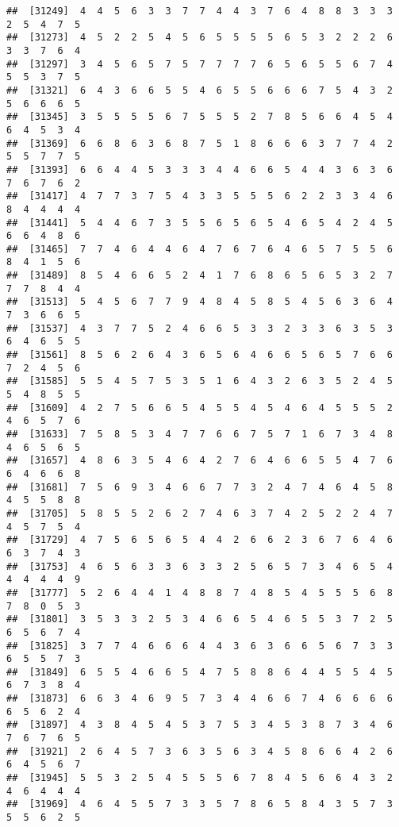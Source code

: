 \documentclass[
]{book}
\begin{document}
\begin{verbatim}
##  [31249]  4  4  5  6  3  3  7  7  4  4  3  7  6  4  8  8  3  3  3  2  5  4  7  5
##  [31273]  4  5  2  2  5  4  5  6  5  5  5  5  6  5  3  2  2  2  6  3  3  7  6  4
##  [31297]  3  4  5  6  5  7  5  7  7  7  7  6  5  6  5  5  6  7  4  5  5  3  7  5
##  [31321]  6  4  3  6  6  5  5  4  6  5  5  6  6  6  7  5  4  3  2  5  6  6  6  5
##  [31345]  3  5  5  5  5  6  7  5  5  5  2  7  8  5  6  6  4  5  4  6  4  5  3  4
##  [31369]  6  6  8  6  3  6  8  7  5  1  8  6  6  6  3  7  7  4  2  5  5  7  7  5
##  [31393]  6  6  4  4  5  3  3  3  4  4  6  6  5  4  4  3  6  3  6  7  6  7  6  2
##  [31417]  4  7  7  3  7  5  4  3  3  5  5  5  6  2  2  3  3  4  6  8  4  4  4  4
##  [31441]  5  4  4  6  7  3  5  5  6  5  6  5  4  6  5  4  2  4  5  6  6  4  8  6
##  [31465]  7  7  4  6  4  4  6  4  7  6  7  6  4  6  5  7  5  5  6  8  4  1  5  6
##  [31489]  8  5  4  6  6  5  2  4  1  7  6  8  6  5  6  5  3  2  7  7  7  8  4  4
##  [31513]  5  4  5  6  7  7  9  4  8  4  5  8  5  4  5  6  3  6  4  7  3  6  6  5
##  [31537]  4  3  7  7  5  2  4  6  6  5  3  3  2  3  3  6  3  5  3  6  4  6  5  5
##  [31561]  8  5  6  2  6  4  3  6  5  6  4  6  6  5  6  5  7  6  6  7  2  4  5  6
##  [31585]  5  5  4  5  7  5  3  5  1  6  4  3  2  6  3  5  2  4  5  5  4  8  5  5
##  [31609]  4  2  7  5  6  6  5  4  5  5  4  5  4  6  4  5  5  5  2  4  6  5  7  6
##  [31633]  7  5  8  5  3  4  7  7  6  6  7  5  7  1  6  7  3  4  8  4  6  5  6  5
##  [31657]  4  8  6  3  5  4  6  4  2  7  6  4  6  6  5  5  4  7  6  6  4  6  6  8
##  [31681]  7  5  6  9  3  4  6  6  7  7  3  2  4  7  4  6  4  5  8  4  5  5  8  8
##  [31705]  5  8  5  5  2  6  2  7  4  6  3  7  4  2  5  2  2  4  7  4  5  7  5  4
##  [31729]  4  7  5  6  5  6  5  4  4  2  6  6  2  3  6  7  6  4  6  6  3  7  4  3
##  [31753]  4  6  5  6  3  3  6  3  3  2  5  6  5  7  3  4  6  5  4  4  4  4  4  9
##  [31777]  5  2  6  4  4  1  4  8  8  7  4  8  5  4  5  5  5  6  8  7  8  0  5  3
##  [31801]  3  5  3  3  2  5  3  4  6  6  5  4  6  5  5  3  7  2  5  6  5  6  7  4
##  [31825]  3  7  7  4  6  6  6  4  4  3  6  3  6  6  5  6  7  3  3  6  5  5  7  3
##  [31849]  6  5  5  4  6  6  5  4  7  5  8  8  6  4  4  5  5  4  5  6  7  3  8  4
##  [31873]  6  6  3  4  6  9  5  7  3  4  4  6  6  7  4  6  6  6  6  6  5  6  2  4
##  [31897]  4  3  8  4  5  4  5  3  7  5  3  4  5  3  8  7  3  4  6  7  6  7  6  5
##  [31921]  2  6  4  5  7  3  6  3  5  6  3  4  5  8  6  6  4  2  6  6  4  5  6  7
##  [31945]  5  5  3  2  5  4  5  5  5  6  7  8  4  5  6  6  4  3  2  4  6  4  4  4
##  [31969]  4  6  4  5  5  7  3  3  5  7  8  6  5  8  4  3  5  7  3  5  5  6  2  5

\end{verbatim}
\end{document}
